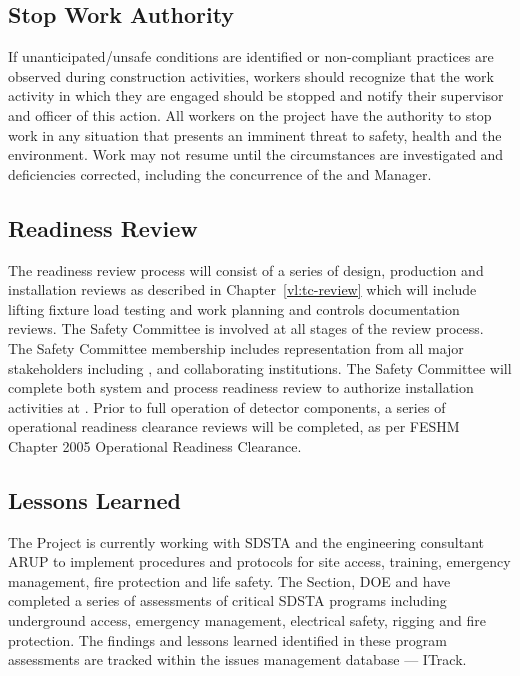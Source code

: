 \subsection{Stop Work Authority}

If unanticipated/unsafe conditions are identified or non-compliant
practices are observed during construction activities, workers should
recognize that the work activity in which they are engaged should be
stopped and notify their supervisor and  officer of
this action. All workers on the  project have the
authority to stop work in any situation that presents an imminent
threat to safety, health and the environment. Work may not resume
until the circumstances are investigated and deficiencies corrected,
including the concurrence of the  
and   Manager.

\subsection{ Readiness Review}

The  readiness review process will consist of a series of
design, production and installation reviews as described in
Chapter~\ref{vl:tc-review} which will include lifting fixture load
testing and work planning and controls documentation reviews. The
 Safety Committee is involved at all stages of the review
process.  The  Safety Committee membership includes
representation from all major stakeholders including \fnal, \surf and
 collaborating institutions. The  Safety
Committee will complete both system and process readiness review to
authorize installation activities at \surf.  Prior to full operation
of detector components, a series of operational readiness clearance
reviews will be completed, as per FESHM Chapter 2005 Operational
Readiness Clearance.

\subsection{Lessons Learned}

The  Project is currently working with SDSTA and the 
engineering consultant ARUP to implement  procedures and
protocols for site access, training, emergency management, fire
protection and life safety. The \fnal {} Section, DOE and
  have completed a series of assessments of
critical SDSTA  programs including underground access,
emergency management, electrical safety, rigging and fire
protection. The findings and lessons learned identified in these
 program assessments are tracked within the \fnal issues management
database --- ITrack.

